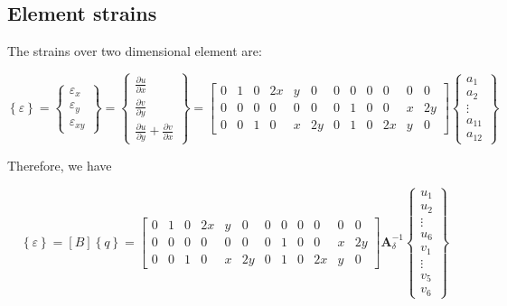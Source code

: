 \subsection{Element strains}
The strains over two dimensional element are:

\begin{equation}
\left\lbrace \varepsilon \right\rbrace = \left\lbrace \begin{array}{c}
\varepsilon_x \\
\varepsilon_y \\
\varepsilon_{xy}
\end{array} \right\rbrace = \left\lbrace \begin{array}{c}
\frac{\partial u}{\partial x} \\
\frac{\partial v}{\partial y} \\
\frac{\partial u}{\partial y} + \frac{\partial v}{\partial x} \end{array} \right\rbrace
= \begin{bmatrix}
0 & 1 & 0 & 2x & y & 0 & 0 & 0 & 0 & 0 & 0 & 0 \\
0 & 0 & 0 & 0 & 0 & 0 & 0 & 1 & 0 & 0 & x & 2y \\
0 & 0 & 1 & 0 & x & 2y & 0 & 1 & 0 & 2x & y & 0
\end{bmatrix} \left\lbrace \begin{array}{c} 
a_1 \\
a_2 \\
\vdots \\
a_{11} \\
a_{12}
\end{array} \right\rbrace
\end{equation}

Therefore, we have 

\begin{equation}
\left\lbrace \varepsilon \right \rbrace = [B] \left\lbrace q \right\rbrace = \begin{bmatrix}
0 & 1 & 0 & 2x & y & 0 & 0 & 0 & 0 & 0 & 0 & 0 \\
0 & 0 & 0 & 0 & 0 & 0 & 0 & 1 & 0 & 0 & x & 2y \\
0 & 0 & 1 & 0 & x & 2y & 0 & 1 & 0 & 2x & y & 0
\end{bmatrix} \mathbf{A}_\delta^{-1} \left\lbrace \begin{array}{c}
u_1 \\
u_2 \\
\vdots \\
u_6 \\
v_1 \\
\vdots \\
v_5 \\
v_6 \end{array} \right\rbrace
\end{equation}

